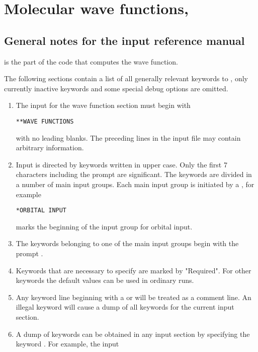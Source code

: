 \chapter{\label{chap:inpref} Molecular wave functions, {\sir}}

\section{\label{sec:ref-notes} General notes for the {\sir} input reference
manual}

{\sir} is the part of the code that computes the wave function.

The following sections contain a list of all generally relevant keywords to
{\sir}, only currently inactive keywords and some special debug
options are omitted.

\begin{enumerate}
\item {The input for the wave function section must begin with

\begin{inputex} \begin{verbatim}
**WAVE FUNCTIONS
\end{verbatim} \end{inputex}
   with no leading blanks.  The preceding lines in the input file may
   contain arbitrary information.
}
\item{ Input is directed by keywords written in upper case.
   Only the first 7 characters including the prompt are significant.
   The keywords are divided in a number of main input groups. Each main
   input group is initiated by a {\starkey}, for example

\begin{inputex} \begin{verbatim}
*ORBITAL INPUT
\end{verbatim} \end{inputex}
   marks the beginning of the input group for orbital input.
}
\item { The keywords belonging to one of the main input groups begin with
   the prompt {\dotkey}.
}
\item { Keywords that are necessary to specify are marked by "Required".
   For other keywords the default values can be used in ordinary runs.
}
\item {Any keyword line beginning with a \quotekw{!} or
   \quotekw{\#} will be treated as a
   comment line.  An illegal keyword will cause a dump of all keywords
   for the current input section.
}
\item{A dump of keywords can be obtained in any input section by
specifying the keyword .  For example, the input

}
\end{enumerate}
